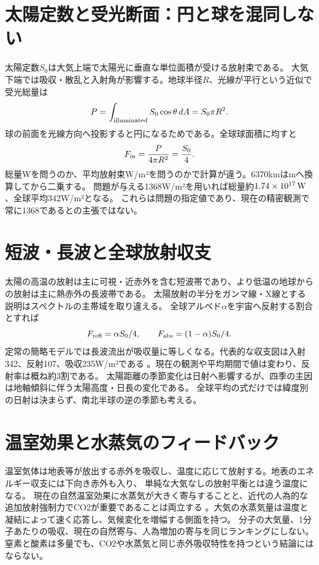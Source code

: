 \section{太陽定数と受光断面：円と球を混同しない}
\label{theory:atmosphere:geometry}
太陽定数\(S_0\)は大気上端で太陽光に垂直な単位面積が受ける放射束である。
大気下端では吸収・散乱と入射角が影響する。地球半径\(R\)、光線が平行という近似で受光総量は
\[
 P=\int_{\rm illuminated} S_0\cos\theta\,dA=S_0\pi R^2.
\]
球の前面を光線方向へ投影すると円になるためである。全球球面積に均すと
\[
 F_{\rm in}=\frac{P}{4\pi R^2}=\frac{S_0}{4}.
\]
総量Wを問うのか、平均放射束W/m²を問うのかで計算が違う。6370kmはmへ換算してから二乗する。
問題が与える1368W/m²を用いれば総量約\(1.74\times10^{17}\,{\rm W}\)、全球平均342W/m²となる。
これらは問題の指定値であり、現在の精密観測で常に1368であるとの主張ではない。

\section{短波・長波と全球放射収支}
\label{theory:atmosphere:radiation}
太陽の高温の放射は主に可視・近赤外を含む短波帯であり、より低温の地球からの放射は主に熱赤外の長波帯である。
太陽放射の半分をガンマ線・X線とする説明はスペクトルの主帯域を取り違える。
全球アルベド\(\alpha\)を宇宙へ反射する割合とすれば
\[
 F_{\rm refl}=\alpha S_0/4,\qquad F_{\rm abs}=(1-\alpha)S_0/4.
\]
定常の簡略モデルでは長波流出が吸収量に等しくなる。代表的な収支図は入射342、反射107、吸収235W/m²である
\cite{atm_nasa_budget}。現在の観測や平均期間で値は変わり、反射率は概ね約3割である\cite{atm_nasa_albedo}。
太陽距離の季節変化は日射へ影響するが、四季の主因は地軸傾斜に伴う太陽高度・日長の変化である。
全球平均の式だけでは緯度別の日射は決まらず、南北半球の逆の季節も考える。

\section{温室効果と水蒸気のフィードバック}
\label{theory:atmosphere:greenhouse}
温室気体は地表等が放出する赤外を吸収し、温度に応じて放射する。地表のエネルギー収支には下向き赤外も入り、
単純な大気なしの放射平衡とは違う温度になる。
現在の自然温室効果に水蒸気が大きく寄与することと、近代の人為的な追加放射強制力でCO2が重要であることは両立する
\cite{atm_jma_ghg2012}。大気の水蒸気量は温度と凝結によって速く応答し、気候変化を増幅する側面を持つ。
分子の大気量、1分子あたりの吸収、現在の自然寄与、人為増加の寄与を同じランキングにしない。
窒素と酸素は多量でも、CO2や水蒸気と同じ赤外吸収特性を持つという結論にはならない。

